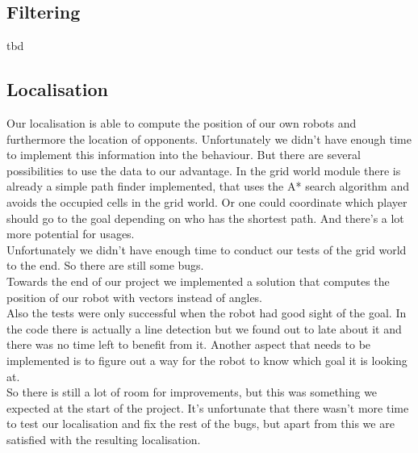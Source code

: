 \documentclass[lnicst,a4paper]{svmultln}
\begin{document}
\subsection{Filtering}
\label{sec:results_filtering}
tbd

\subsection{Localisation}
\label{sec:results_localisation}
Our localisation is able to compute the position of our own robots and furthermore the location of opponents. Unfortunately we didn't have enough time to implement this information into the behaviour. But there are several possibilities to use the data to our advantage. In the grid world module there is already a simple path finder implemented, that uses the A* search algorithm and avoids the occupied cells in the grid world. Or one could coordinate which player should go to the goal depending on who has the shortest path. And there's a lot more potential for usages.
\\
Unfortunately we didn't have enough time to conduct our tests of the grid world to the end. So there are still some bugs. 
\\
Towards the end of our project we implemented a solution that computes the position of our robot with vectors instead of angles.
\\
Also the tests were only successful when the robot had good sight of the goal. In the code there is actually a line detection but we found out to late about it and there was no time left to benefit from it. Another aspect that needs to be implemented is to figure out a way for the robot to know which goal it is looking at.
\\
So there is still a lot of room for improvements, but this was something we expected at the start of the project. It's unfortunate that there wasn't more time to test our localisation and fix the rest of the bugs, but apart from this we are satisfied with the resulting localisation.
\end{document}
